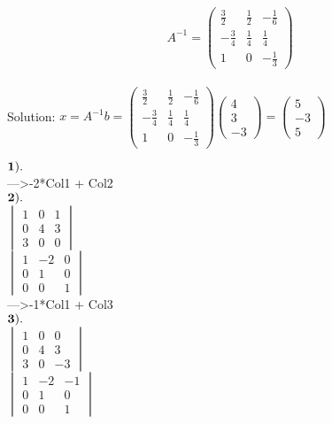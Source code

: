 \documentclass[]{article}
\begin{document}
\[A^{-1}=\begin{pmatrix} \frac{3}{2}&   \frac{1}{2} &   -\frac{1}{6}\\ -\frac{3}{4} &   \frac{1}{4} &   \frac{1}{4} \\ 1 &   0 &   -\frac{1}{3} \end{pmatrix}\]\\
 Solution:
\(x=A^{-1}b=\begin{pmatrix} \frac{3}{2}& \frac{1}{2} & -\frac{1}{6}\\ -\frac{3}{4} & \frac{1}{4} & \frac{1}{4} \\ 1 & 0 & -\frac{1}{3} \end{pmatrix}\)\(\begin{pmatrix} 4\\ 3\\ -3 \end{pmatrix}=\begin{pmatrix} 5\\ -3\\ 5 \end{pmatrix}\)\\
 \newpage

\(\bold{1).}\)\\

---\textgreater{}-2*Col1 + Col2\\

\(\bold{2).}\)\\
 \(\begin{vmatrix} 1 & 0 & 1\\ 0 & 4 & 3 \\ 3 & 0 & 0 \end{vmatrix}\)\\

\(\begin{vmatrix} 1 & -2 & 0\\ 0 & 1 & 0 \\ 0 & 0 & 1 \end{vmatrix}\)\\

---\textgreater{}-1*Col1 + Col3\\

\(\bold{3).}\)\\
 \(\begin{vmatrix} 1 & 0 & 0\\ 0 & 4 & 3 \\ 3 & 0 & -3 \end{vmatrix}\)\\

\(\begin{vmatrix} 1 & -2 & -1\\ 0 & 1 & 0 \\ 0 & 0 & 1 \end{vmatrix}\)\\
\end{document}

